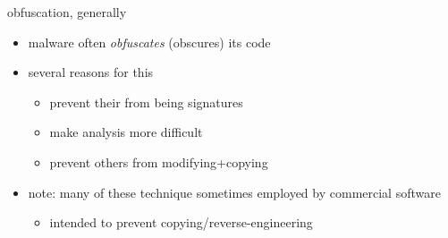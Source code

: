 \begin{frame}{obfuscation, generally}
    \begin{itemize}
    \item malware often \textit{obfuscates} (obscures) its code
    \item several reasons for this
        \begin{itemize}
        \item prevent their from being signatures
        \item make analysis more difficult
        \item prevent others from modifying+copying
        \end{itemize}
    \vspace{.5cm}
    \item note: many of these technique sometimes employed by commercial software
        \begin{itemize}
        \item intended to prevent copying/reverse-engineering
        \end{itemize}
    \end{itemize}
\end{frame}
